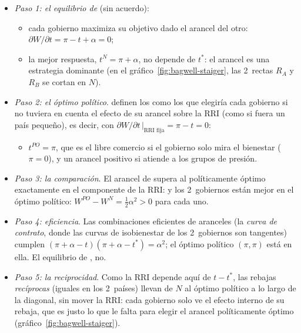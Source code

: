 \documentclass[11pt]{article}
\begin{document}
\begin{itemize}
\item \emph{Paso 1: el equilibrio de } (sin acuerdo):
  \begin{itemize}
  \item cada gobierno maximiza su objetivo dado el arancel del otro: $\partial W/\partial t=\pi-t+\alpha=0$;
  \item la mejor respuesta, $t^N=\pi+\alpha$, no depende de $t^*$: el arancel es una estrategia dominante (en el gráfico~\ref{fig:bagwell-staiger}, las 2~rectas $R_A$ y $R_B$ se cortan en $N$).
  \end{itemize}
\item \emph{Paso 2: el óptimo político}. \textcite{BagwellStaiger1999Economic} definen los  como los que elegiría cada gobierno si no tuviera en cuenta el efecto de su arancel sobre la RRI (como si fuera un país pequeño), es decir, con $\partial W/\partial t\,\big|_{\text{RRI fija}}=\pi-t=0$:
  \begin{itemize}
  \item $t^{\mathit{PO}}=\pi$, que es el libre comercio si el gobierno solo mira el bienestar ($\pi=0$), y un arancel positivo si atiende a los grupos de presión.
  \end{itemize}
\item \emph{Paso 3: la comparación}. El arancel de  supera al políticamente óptimo exactamente en el componente de la RRI:
  y los 2~gobiernos están mejor en el óptimo político: $W^{\mathit{PO}}-W^{N}=\tfrac12\alpha^2>0$ para cada uno.
\item \emph{Paso 4: eficiencia}. Las combinaciones eficientes de aranceles (la \emph{curva de contrato}, donde las curvas de isobienestar de los 2~gobiernos son tangentes) cumplen $(\pi+\alpha-t)(\pi+\alpha-t^*)=\alpha^2$; el óptimo político $(\pi,\pi)$ está en ella. El equilibrio de , no.
\item \emph{Paso 5: la reciprocidad}. Como la RRI depende aquí de $t-t^*$, las rebajas \emph{recíprocas} (iguales en los 2~países) llevan de $N$ al óptimo político a lo largo de la diagonal, sin mover la RRI: cada gobierno solo ve el efecto interno de su rebaja, que es justo lo que le falta para elegir el arancel políticamente óptimo (gráfico~\ref{fig:bagwell-staiger}).
\end{itemize}
\end{document}

